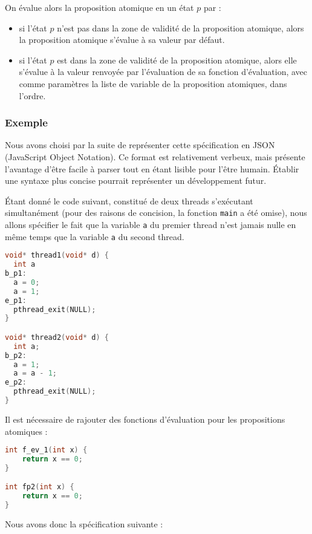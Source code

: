 On évalue alors la proposition atomique en un état \(p\) par :

\begin{itemize}
\item
  si l'état \(p\) n'est pas dans la zone de validité de la proposition
  atomique, alors la proposition atomique s'évalue à sa valeur par
  défaut.
\item
  si l'état \(p\) est dans la zone de validité de la proposition
  atomique, alors elle s'évalue à la valeur renvoyée par l'évaluation de
  sa fonction d'évaluation, avec comme paramètres la liste de variable
  de la proposition atomiques, dans l'ordre.
\end{itemize}

\subsubsection{Exemple}\label{exemple}

Nous avons choisi par la suite de représenter cette spécification en
JSON (JavaScript Object Notation)\cite{json}. Ce format est
relativement verbeux, mais présente l'avantage d'être facile à parser
tout en étant lisible pour l'être humain. Établir une syntaxe plus
concise pourrait représenter un développement futur.

Étant donné le code suivant, constitué de deux threads s'exécutant
simultanément (pour des raisons de concision, la fonction
\lstinline!main! a été omise), nous allons spécifier le fait que la
variable \lstinline!a! du premier thread n'est jamais nulle en même temps que
la variable \lstinline!a! du second thread.

\begin{lstlisting}[language=C]
void* thread1(void* d) {
  int a
b_p1:
  a = 0;
  a = 1;
e_p1:
  pthread_exit(NULL);
}

void* thread2(void* d) {
  int a;
b_p2:
  a = 1;
  a = a - 1;
e_p2:
  pthread_exit(NULL);
}
\end{lstlisting}

Il est nécessaire de rajouter des fonctions d'évaluation pour les
propositions atomiques :

\begin{lstlisting}[language=C]
int f_ev_1(int x) {
    return x == 0;
}

int fp2(int x) {
    return x == 0;
}
\end{lstlisting}

Nous avons donc la spécification suivante :

